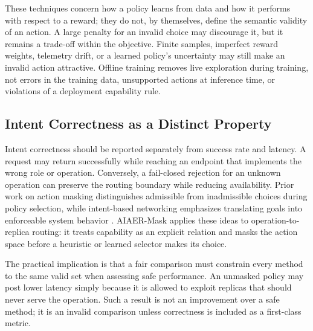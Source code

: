 \documentclass[conference]{IEEEtran}
\begin{document}
These techniques concern how a policy learns from data and how it performs with respect to a reward; they do not, by themselves, define the semantic validity of an action. A large penalty for an invalid choice may discourage it, but it remains a trade-off within the objective. Finite samples, imperfect reward weights, telemetry drift, or a learned policy's uncertainty may still make an invalid action attractive. Offline training removes live exploration during training, not errors in the training data, unsupported actions at inference time, or violations of a deployment capability rule.

\subsection{Intent Correctness as a Distinct Property}
Intent correctness should be reported separately from success rate and latency. A request may return successfully while reaching an endpoint that implements the wrong role or operation. Conversely, a fail-closed rejection for an unknown operation can preserve the routing boundary while reducing availability. Prior work on action masking distinguishes admissible from inadmissible choices during policy selection, while intent-based networking emphasizes translating goals into enforceable system behavior \cite{dey2023,leivadeas2023}. AIAER-Mask applies these ideas to operation-to-replica routing: it treats capability as an explicit relation and masks the action space before a heuristic or learned selector makes its choice.

The practical implication is that a fair comparison must constrain every method to the same valid set when assessing safe performance. An unmasked policy may post lower latency simply because it is allowed to exploit replicas that should never serve the operation. Such a result is not an improvement over a safe method; it is an invalid comparison unless correctness is included as a first-class metric.
\end{document}
